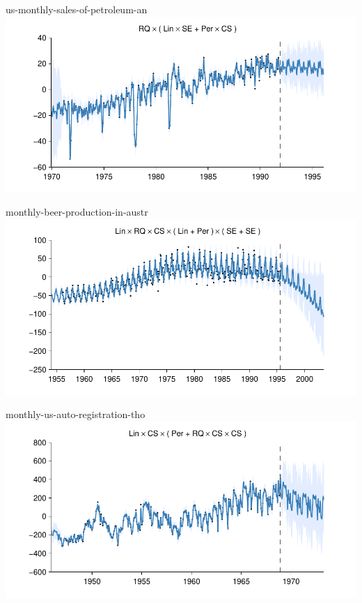 \begin{frame}{us-monthly-sales-of-petroleum-an}
  \center
  \includegraphics[width=1.0\textwidth]{figures/us-monthly-sales-of-petroleum-an/us-monthly-sales-of-petroleum-an_all}
\end{frame}    

\begin{frame}{monthly-beer-production-in-austr}
  \center
  \includegraphics[width=1.0\textwidth]{figures/monthly-beer-production-in-austr/monthly-beer-production-in-austr_all}
\end{frame}

\begin{frame}{monthly-us-auto-registration-tho}
  \center
  \includegraphics[width=1.0\textwidth]{figures/monthly-us-auto-registration-tho/monthly-us-auto-registration-tho_all}
\end{frame}  

